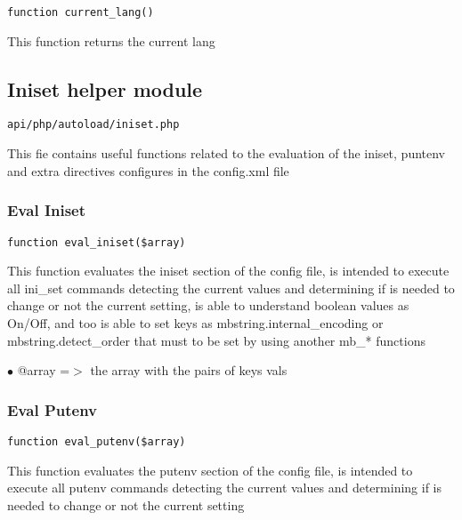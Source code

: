 \documentclass[a4paper]{article}
\begin{document}
\begin{lstlisting}
function current_lang()
\end{lstlisting}

This function returns the current lang

\hypertarget{toc153}{}
\subsection{Iniset helper module}

\begin{lstlisting}
api/php/autoload/iniset.php
\end{lstlisting}

This fie contains useful functions related to the evaluation of the iniset, puntenv and extra
directives configures in the config.xml file

\hypertarget{toc154}{}
\subsubsection{Eval Iniset}

\begin{lstlisting}
function eval_iniset($array)
\end{lstlisting}

This function evaluates the iniset section of the config file, is intended
to execute all ini\_set commands detecting the current values and determining
if is needed to change or not the current setting, is able to understand
boolean values as On/Off, and too is able to set keys as mbstring.internal\_encoding
or mbstring.detect\_order that must to be set by using another mb\_* functions

\begin{compactitem}
\item[\color{myblue}$\bullet$] @array =$>$ the array with the pairs of keys vals
\end{compactitem}

\hypertarget{toc155}{}
\subsubsection{Eval Putenv}

\begin{lstlisting}
function eval_putenv($array)
\end{lstlisting}

This function evaluates the putenv section of the config file, is intended
to execute all putenv commands detecting the current values and determining
if is needed to change or not the current setting
\end{document}
